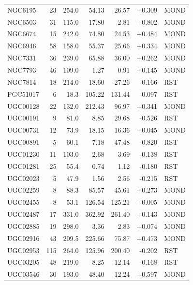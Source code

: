 \documentclass[11pt,a4paper]{article}
\begin{document}
\begin{longtable}{lrrrrrl}
NGC6195              &  23 &  254.0 &    54.13 &    26.57 & +0.309 & MOND \\
NGC6503              &  31 &  115.0 &    17.80 &     2.81 & +0.802 & MOND \\
NGC6674              &  15 &  242.0 &    74.80 &    24.53 & +0.484 & MOND \\
NGC6946              &  58 &  158.0 &    55.37 &    25.66 & +0.334 & MOND \\
NGC7331              &  36 &  239.0 &    65.88 &    36.00 & +0.262 & MOND \\
NGC7793              &  46 &  109.0 &     1.27 &     0.91 & +0.145 & MOND \\
NGC7814              &  18 &  214.0 &    18.60 &    27.26 & -0.166 & RST \\
PGC51017             &   6 &   18.3 &   105.22 &   131.44 & -0.097 & RST \\
UGC00128             &  22 &  132.0 &   212.43 &    96.97 & +0.341 & MOND \\
UGC00191             &   9 &   81.0 &     8.85 &    29.68 & -0.526 & RST \\
UGC00731             &  12 &   73.9 &    18.15 &    16.36 & +0.045 & MOND \\
UGC00891             &   5 &   60.1 &     7.18 &    47.48 & -0.820 & RST \\
UGC01230             &  11 &  103.0 &     2.68 &     3.69 & -0.138 & RST \\
UGC01281             &  25 &   55.4 &     0.74 &     1.12 & -0.180 & RST \\
UGC02023             &   5 &   47.9 &     1.56 &     2.56 & -0.215 & RST \\
UGC02259             &   8 &   88.3 &    85.57 &    45.61 & +0.273 & MOND \\
UGC02455             &   8 &   53.1 &   126.54 &   125.21 & +0.005 & MOND \\
UGC02487             &  17 &  331.0 &   362.92 &   261.40 & +0.143 & MOND \\
UGC02885             &  19 &  298.0 &     3.36 &     2.83 & +0.074 & MOND \\
UGC02916             &  43 &  209.5 &   225.66 &    75.87 & +0.473 & MOND \\
UGC02953             & 115 &  264.0 &   125.96 &   200.40 & -0.202 & RST \\
UGC03205             &  48 &  219.0 &     8.25 &    12.14 & -0.168 & RST \\
UGC03546             &  30 &  193.0 &    48.40 &    12.24 & +0.597 & MOND \\

\end{longtable}
\end{document}
